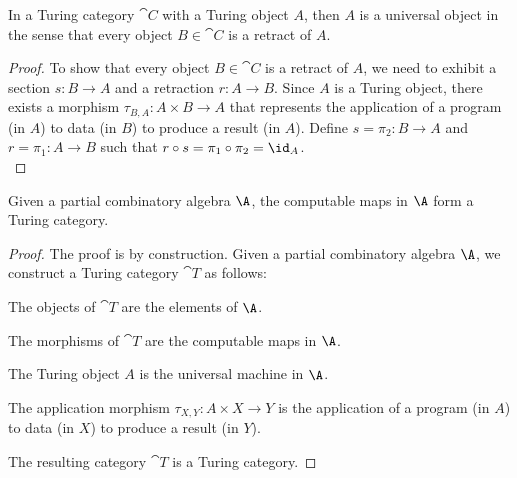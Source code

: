 \begin{lemma}
  In a Turing category $\cat{C}$ with a Turing object $A$,
  then $A$ is a universal object in the sense that
  every object $B \in \cat{C}$ is a retract of $A$.
  \begin{proof}
    To show that every object $B \in \cat{C}$ is a retract of $A$,
    we need to exhibit a section $s : B \to A$ and a retraction $r : A \to B$.
    Since $A$ is a Turing object, there exists a morphism
    $\tau_{B, A} : A \times B \to A$ that represents the application
    of a program (in $A$) to data (in $B$) to produce a result (in $A$).
    Define $s = \pi_2 : B \to A$ and $r = \pi_1 : A \to B$
    such that $r \circ s = \pi_1 \circ \pi_2 = \id_A$. \\
  \end{proof}
\end{lemma}



\begin{theorem}
  Given a partial combinatory algebra $\A$,
  the computable maps in $\A$ form a Turing category.

  \begin{proof}
    The proof is by construction.
    Given a partial combinatory algebra $\A$,
    we construct a Turing category $\cat{T}$ as follows:
    \begin{enumarabic}
      \item The objects of $\cat{T}$ are the elements of $\A$.
      \item The morphisms of $\cat{T}$ are the computable maps in $\A$.
      \item The Turing object $A$ is the universal machine in $\A$.
      \item The application morphism $\tau_{X, Y} : A \times X \to Y$
        is the application of a program (in $A$) to data (in $X$)
        to produce a result (in $Y$).
    \end{enumarabic}
    The resulting category $\cat{T}$ is a Turing category.
  \end{proof}
\end{theorem}

